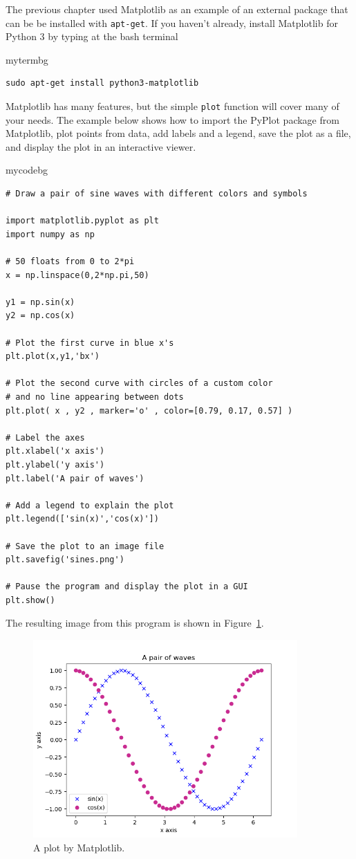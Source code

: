 The previous chapter used Matplotlib as an example of an external package that can be be installed with \texttt{apt-get}.
If you haven't already, install Matplotlib for Python 3 by typing at the bash terminal
\begin{tsession}{mytermbg}
\begin{verbatim}
sudo apt-get install python3-matplotlib
\end{verbatim}
\end{tsession}
Matplotlib has many features, but the simple \texttt{plot} function
will cover many of your needs.
The example below shows how to import the PyPlot package from Matplotlib,
plot points from data,
add labels and a legend,
save the plot as a file,
and display the plot in an interactive viewer.
\begin{tsession}{mycodebg}
\begin{verbatim}
# Draw a pair of sine waves with different colors and symbols

import matplotlib.pyplot as plt
import numpy as np

# 50 floats from 0 to 2*pi
x = np.linspace(0,2*np.pi,50)

y1 = np.sin(x)
y2 = np.cos(x)

# Plot the first curve in blue x's
plt.plot(x,y1,'bx')

# Plot the second curve with circles of a custom color
# and no line appearing between dots
plt.plot( x , y2 , marker='o' , color=[0.79, 0.17, 0.57] )

# Label the axes
plt.xlabel('x axis')
plt.ylabel('y axis')
plt.label('A pair of waves')

# Add a legend to explain the plot
plt.legend(['sin(x)','cos(x)'])

# Save the plot to an image file
plt.savefig('sines.png')

# Pause the program and display the plot in a GUI
plt.show()
\end{verbatim}
\end{tsession}
The resulting image from this program is shown in Figure~\ref{fig0sines}.
\begin{figure}[htb!]
    \centering
    \includegraphics[width=0.9\textwidth]{figures/L12/sines.png}
    \caption{A plot by Matplotlib.}
    \label{fig0sines}
\end{figure}

